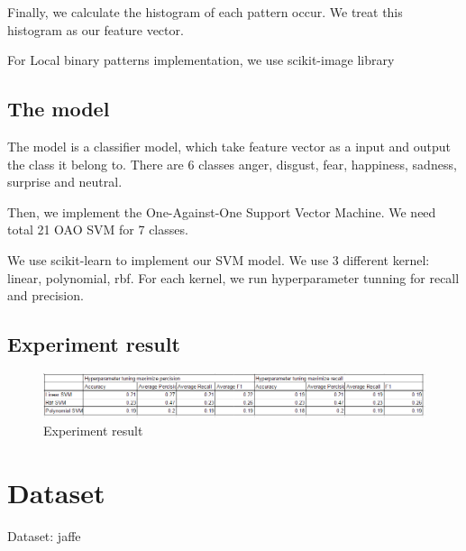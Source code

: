 \documentclass[a4paper, 12pt]{article}
\begin{document}
	Finally, we calculate the histogram of each pattern occur. We treat this histogram as our feature vector.
	
	For Local binary patterns implementation, we use scikit-image library \cite{van2014scikit}
	
	
	
		
\subsection{The model}
	The model is a classifier model, which take feature vector as a input and output the class it belong to. There are 6 classes anger, disgust, fear, happiness, sadness, surprise and neutral.
	
	Then, we implement the One-Against-One Support Vector Machine. We need total 21 OAO SVM for 7 classes.
	
	We use scikit-learn to \cite{pedregosa2011scikit} implement our SVM model. We use 3 different kernel: linear, polynomial, rbf. For each kernel, we run hyperparameter tunning for recall and precision.

\subsection{Experiment result}
		\begin{figure}[H]
			\centering
			\includegraphics[width=1\linewidth]{./figure/experiment_result.png}
			\caption[]{Experiment result}
			\label{fig:result}
		\end{figure}
	

\section{Dataset}
Dataset:  jaffe \cite{lyons1998japanese}





\end{document}
